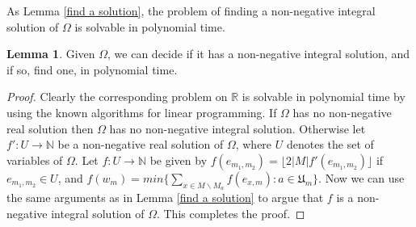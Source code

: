 \documentclass{article}
\theoremstyle{definition}
\newtheorem{lem}{Lemma}
\newcommand\set[1]{\{ #1 \}}
\begin{document}
As Lemma \ref{find a solution}, the problem of finding a non-negative integral solution of $\Omega$ is solvable in polynomial time.
\begin{lem}
\label{find a solution for Omega}
Given $\Omega$, we can decide if it has a non-negative integral solution, and if so, find one, in polynomial time.
\end{lem}
\begin{proof}
Clearly the corresponding problem on $\mathbb{R}$ is solvable in polynomial time by using the known algorithms for linear programming. If $\Omega$ has no non-negative real solution then $\Omega$ has no non-negative integral solution. Otherwise let $f':U\to \mathbb{N}$ be a non-negative real solution of $\Omega$, where $U$ denotes the set of variables of $\Omega$. Let $f:U\to \mathbb{N}$ be given by $f(e_{m_1,m_2})=\lfloor 2 |M|f'(e_{m_1,m_2})\rfloor$ if $e_{m_1,m_2} \in U$, and $f(w_m)=min\set{\underset{x \in M\backslash M_a}{\sum}f(e_{x,m}): a \in \mathfrak{U}_m}$. Now we can use the same arguments as in Lemma \ref{find a solution} to argue that $f$ is a non-negative integral solution of $\Omega$. This completes the proof.
\end{proof}
\end{document}
